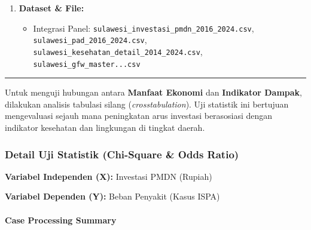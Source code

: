 \documentclass[
]{article}
\providecommand{\tightlist}{%
  \setlength{\itemsep}{0pt}\setlength{\parskip}{0pt}}
\begin{document}
\begin{enumerate}
  \begin{itemize}
  \tightlist
  \item
    \textbf{Variabel Independen/Manfaat (X):}
    \texttt{Realisasi\_Investasi\_Rp} atau \texttt{PAD\_Juta\_Rupiah}
  \item
    \textbf{Variabel Dependen/Beban (Y):} \texttt{Kasus\_ISPA} atau
    \texttt{Deforestasi\_Ha}
  \end{itemize}
\item
  \textbf{Dataset \& File:}

  \begin{itemize}
  \tightlist
  \item
    Integrasi Panel: \texttt{sulawesi\_investasi\_pmdn\_2016\_2024.csv},
    \texttt{sulawesi\_pad\_2016\_2024.csv},
    \texttt{sulawesi\_kesehatan\_detail\_2014\_2024.csv},
    \texttt{sulawesi\_gfw\_master...csv}
  \end{itemize}
\end{enumerate}

\begin{center}\rule{0.5\linewidth}{0.5pt}\end{center}

Untuk menguji hubungan antara \textbf{Manfaat Ekonomi} dan
\textbf{Indikator Dampak}, dilakukan analisis tabulasi silang
(\emph{crosstabulation}). Uji statistik ini bertujuan mengevaluasi
sejauh mana peningkatan arus investasi berasosiasi dengan indikator
kesehatan dan lingkungan di tingkat daerah.

\subsubsection{Detail Uji Statistik (Chi-Square \& Odds
Ratio)}\label{detail-uji-statistik-chi-square-odds-ratio}

\textbf{Variabel Independen (X):} Investasi PMDN (Rupiah)

\textbf{Variabel Dependen (Y):} Beban Penyakit (Kasus ISPA)

\paragraph{Case Processing Summary}\label{case-processing-summary}
\end{document}
